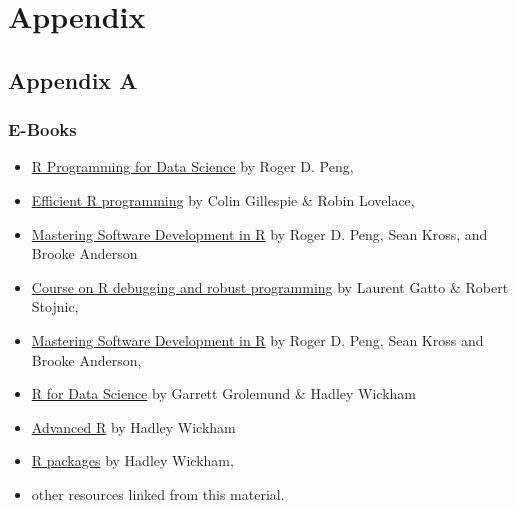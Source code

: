 \documentclass[]{book}
\providecommand{\tightlist}{%
  \setlength{\itemsep}{0pt}\setlength{\parskip}{0pt}}
\theoremstyle{definition}
\theoremstyle{definition}
\theoremstyle{definition}
\theoremstyle{remark}
\begin{document}
\part{Appendix}\label{part-appendix}

\chapter{Appendix A}\label{appendix-resources}

\section{E-Books}\label{e-books}

\begin{itemize}
\tightlist
\item
  \href{https://bookdown.org/rdpeng/rprogdatascience/}{R Programming for
  Data Science} by Roger D. Peng,
\item
  \href{https://bookdown.org/csgillespie/efficientR/}{Efficient R
  programming} by Colin Gillespie \& Robin Lovelace,
\item
  \href{https://bookdown.org/rdpeng/RProgDA/}{Mastering Software
  Development in R} by Roger D. Peng, Sean Kross, and Brooke Anderson
\item
  \href{https://github.com/lgatto/2016-02-25-adv-programming-EMBL}{Course
  on R debugging and robust programming} by Laurent Gatto \& Robert
  Stojnic,
\item
  \href{https://bookdown.org/rdpeng/RProgDA/}{Mastering Software
  Development in R} by Roger D. Peng, Sean Kross and Brooke Anderson,
\item
  \href{http://r4ds.had.co.nz/index.html}{R for Data Science} by Garrett
  Grolemund \& Hadley Wickham
\item
  \href{http://adv-r.had.co.nz/}{Advanced R} by Hadley Wickham
\item
  \href{http://r-pkgs.had.co.nz/}{R packages} by Hadley Wickham,
\item
  other resources linked from this material.
\end{itemize}


\end{document}
